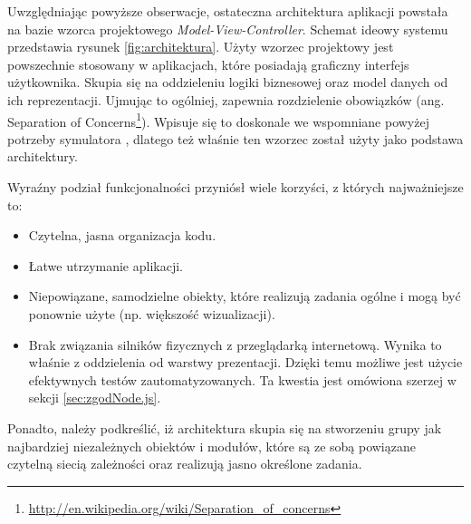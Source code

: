 Uwzględniając powyższe obserwacje, ostateczna architektura aplikacji powstała na
bazie wzorca projektowego \emph{Model-View-Controller}. Schemat ideowy systemu
\en przedstawia rysunek \ref{fig:architektura}. Użyty wzorzec projektowy jest
powszechnie stosowany w aplikacjach, które posiadają graficzny interfejs
użytkownika. Skupia się na oddzieleniu logiki biznesowej oraz model danych od
ich reprezentacji. Ujmując to ogólniej, zapewnia rozdzielenie obowiązków (ang.
Separation of
Concerns\footnote{\url{http://en.wikipedia.org/wiki/Separation_of_concerns}}).
Wpisuje się to doskonale we wspomniane powyżej potrzeby symulatora \en, dlatego
też właśnie ten wzorzec został użyty jako podstawa architektury.

Wyraźny podział funkcjonalności przyniósł wiele korzyści, z których
najważniejsze to:

\begin{itemize}
\item Czytelna, jasna organizacja kodu.

\item Łatwe utrzymanie aplikacji.

\item Niepowiązane, samodzielne obiekty, które realizują zadania ogólne i mogą
być ponownie użyte (np. większość wizualizacji).

\item Brak związania silników fizycznych z przeglądarką internetową. Wynika to
właśnie z oddzielenia od warstwy prezentacji. Dzięki temu możliwe jest użycie
efektywnych testów zautomatyzowanych. Ta kwestia jest omówiona szerzej w sekcji
\ref{sec:zgodNode.js}.

\end{itemize}

Ponadto, należy podkreślić, iż architektura \en skupia się na stworzeniu grupy
jak najbardziej niezależnych obiektów i modułów, które są ze sobą powiązane
czytelną siecią zależności oraz realizują jasno określone zadania.

